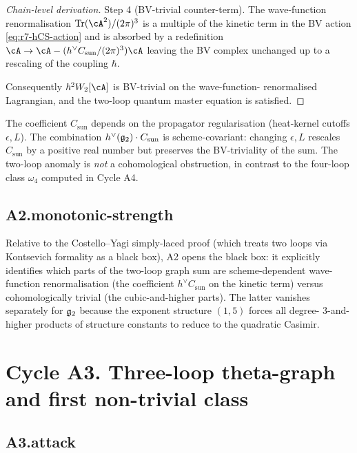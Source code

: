 \begin{proof}[Chain-level derivation]
Step 4 (BV-trivial counter-term). The wave-function renormalisation
$\mathrm{Tr}(\cA^2) / (2\pi)^3$ is a multiple of the kinetic term in
the BV action \eqref{eq:r7-hCS-action} and is absorbed by a redefinition
$\cA \to \cA - (h^\vee C_{\mathrm{sun}} / (2\pi)^3) \cA$ leaving the
BV complex unchanged up to a rescaling of the coupling $\hbar$.

Consequently $\hbar^2 W_2[\cA]$ is BV-trivial on the wave-function-
renormalised Lagrangian, and the two-loop quantum master equation is
satisfied.
\end{proof}

\begin{remark}
\label{rem:r7-scheme-dependence-two-loop}
The coefficient $C_{\mathrm{sun}}$ depends on the propagator
regularisation (heat-kernel cutoffs $\epsilon, L$). The combination
$h^\vee(\mathfrak{g}_2) \cdot C_{\mathrm{sun}}$ is scheme-covariant: changing
$\epsilon, L$ rescales $C_{\mathrm{sun}}$ by a positive real number
but preserves the BV-triviality of the sum. The two-loop anomaly is
\emph{not} a cohomological obstruction, in contrast to the four-loop
class $\omega_4$ computed in Cycle A4.
\end{remark}

\subsection*{A2.monotonic-strength}

Relative to the Costello--Yagi simply-laced proof (which treats two
loops via Kontsevich formality as a black box), A2 opens the black
box: it explicitly identifies which parts of the two-loop graph sum
are scheme-dependent wave-function renormalisation (the coefficient
$h^\vee C_{\mathrm{sun}}$ on the kinetic term) versus cohomologically
trivial (the cubic-and-higher parts). The latter vanishes separately
for $\mathfrak{g}_2$ because the exponent structure $(1, 5)$ forces all degree-
$3$-and-higher products of structure constants to reduce to the
quadratic Casimir.

\section*{Cycle A3. Three-loop theta-graph and first non-trivial class}

\subsection*{A3.attack}


